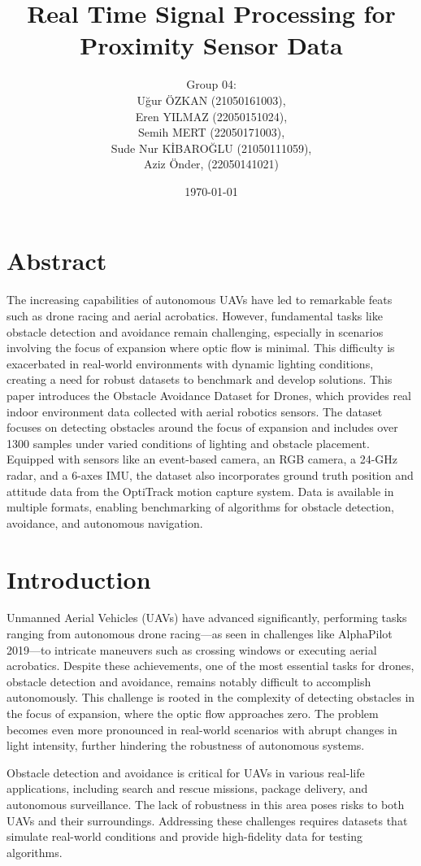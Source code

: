 \documentclass[12pt,a4paper]{article}
\title{Real Time Signal Processing for Proximity Sensor Data}
\author{
    Group 04: \\
    Uğur ÖZKAN (21050161003), \\
    Eren YILMAZ (22050151024), \\
    Semih MERT (22050171003), \\
    Sude Nur KİBAROĞLU (21050111059), \\
    Aziz Önder, (22050141021)\\
}
\date{\today}
\begin{document}
\maketitle
\section{Abstract}

The increasing capabilities of autonomous UAVs have led to remarkable feats such as drone racing and aerial acrobatics. However, fundamental tasks like obstacle detection and avoidance remain challenging, especially in scenarios involving the focus of expansion where optic flow is minimal. This difficulty is exacerbated in real-world environments with dynamic lighting conditions, creating a need for robust datasets to benchmark and develop solutions. This paper introduces the Obstacle Avoidance Dataset for Drones, which provides real indoor environment data collected with aerial robotics sensors. The dataset focuses on detecting obstacles around the focus of expansion and includes over 1300 samples under varied conditions of lighting and obstacle placement. Equipped with sensors like an event-based camera, an RGB camera, a 24-GHz radar, and a 6-axes IMU, the dataset also incorporates ground truth position and attitude data from the OptiTrack motion capture system. Data is available in multiple formats, enabling benchmarking of algorithms for obstacle detection, avoidance, and autonomous navigation.

\section{Introduction}

Unmanned Aerial Vehicles (UAVs) have advanced significantly, performing tasks ranging from autonomous drone racing—as seen in challenges like AlphaPilot 2019—to intricate maneuvers such as crossing windows or executing aerial acrobatics. Despite these achievements, one of the most essential tasks for drones, obstacle detection and avoidance, remains notably difficult to accomplish autonomously. This challenge is rooted in the complexity of detecting obstacles in the focus of expansion, where the optic flow approaches zero. The problem becomes even more pronounced in real-world scenarios with abrupt changes in light intensity, further hindering the robustness of autonomous systems.

Obstacle detection and avoidance is critical for UAVs in various real-life applications, including search and rescue missions, package delivery, and autonomous surveillance. The lack of robustness in this area poses risks to both UAVs and their surroundings. Addressing these challenges requires datasets that simulate real-world conditions and provide high-fidelity data for testing algorithms.
\end{document}
